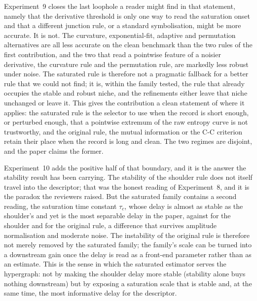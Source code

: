 \documentclass[10pt,a4paper,twocolumn]{article}
\begin{document}
Experiment~9 closes the last loophole a reader might find in that statement,
namely that the derivative threshold is only one way to read the saturation
onset and that a different junction rule, or a standard symbolisation, might
be more accurate.  It is not.  The curvature, exponential-fit, adaptive and
permutation alternatives are all less accurate on the clean benchmark than the
two rules of the first contribution, and the two that read a pointwise feature
of a noisier derivative, the curvature rule and the permutation rule, are
markedly less robust under noise.  The saturated rule is therefore not a
pragmatic fallback for a better rule that we could not find; it is, within the
family tested, the rule that already occupies the stable and robust niche, and
the refinements either leave that niche unchanged or leave it.  This gives the
contribution a clean statement of where it applies: the saturated rule is the
selector to use when the record is short enough, or perturbed enough, that a
pointwise extremum of the raw entropy curve is not trustworthy, and the
original rule, the mutual information or the C-C criterion retain their place
when the record is long and clean.  The two regimes are disjoint, and the
paper claims the former.

Experiment~10 adds the positive half of that boundary, and it is the answer
the stability result has been carrying.  The stability of the shoulder rule
does not itself travel into the descriptor; that was the honest reading of
Experiment~8, and it is the paradox the reviewers raised.  But the saturated
family contains a second reading, the saturation time constant $\tau_c$, whose
delay is almost as stable as the shoulder's and yet is the most separable
delay in the paper, \sepCleanFIT{} against \sepCleanLPF{} for the shoulder and
\sepCleanSE{} for the original rule, a difference that survives amplitude
normalisation and moderate noise.  The instability of the original rule is
therefore not merely removed by the saturated family; the family's scale can
be turned into a downstream gain once the delay is read as a front-end
parameter rather than as an estimate.  This is the sense in which the saturated
estimator serves the hypergraph: not by making the shoulder delay more stable
(stability alone buys nothing downstream) but by exposing a saturation
scale that is stable and, at the same time, the most informative delay for the
descriptor.
\end{document}

